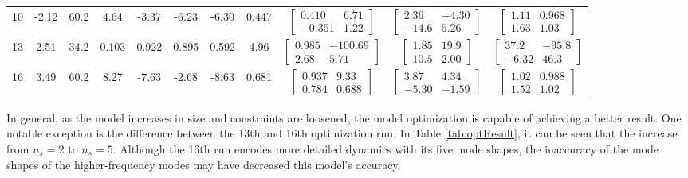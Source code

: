 \begin{landscape}
\begin{table}[H]
\begin{tabular}{ccccccccccc}
		10 & -2.12 & 60.2 & 4.64 & -3.37 & -6.23 & -6.30 & 0.447 & $\begin{bmatrix}0.410 & 6.71 \\ -0.351 & 1.22\end{bmatrix}$ & $\begin{bmatrix}2.36 & -4.30 \\ -14.6 & 5.26\end{bmatrix}$ & $\begin{bmatrix}1.11 & 0.968 \\ 1.63 & 1.03\end{bmatrix}$ \\
		13 & 2.51 & 34.2 & 0.103 & 0.922 & 0.895 & 0.592 & 4.96 & $\begin{bmatrix}0.985 & -100.69 \\ 2.68 & 5.71\end{bmatrix}$ & $\begin{bmatrix}1.85 & 19.9 \\ 10.5 & 2.00\end{bmatrix}$ & $\begin{bmatrix}37.2 & -95.8 \\ -6.32 & 46.3\end{bmatrix}$ \\
		16 & 3.49 & 60.2 & 8.27 & -7.63 & -2.68 & -8.63 & 0.681 & $\begin{bmatrix}0.937 & 9.33 \\ 0.784 & 0.688\end{bmatrix}$ & $\begin{bmatrix}3.87 & 4.34 \\ -5.30 & -1.59\end{bmatrix}$ & $\begin{bmatrix}1.02 & 0.988 \\ 1.52 & 1.02\end{bmatrix}$ \\
		\hline\hline
	\end{tabular}
\end{table}

\end{landscape}

In general, as the model increases in size and constraints are loosened, the model optimization is capable of achieving a better result. One notable exception is the difference between the 13th and 16th optimization run. In Table \ref{tab:optResult}, it can be seen that the increase from $n_s=2$ to $n_s=5$. Although the 16th run encodes more detailed dynamics with its five mode shapes, the inaccuracy of the mode shapes of the higher-frequency modes may have decreased this model's accuracy.


